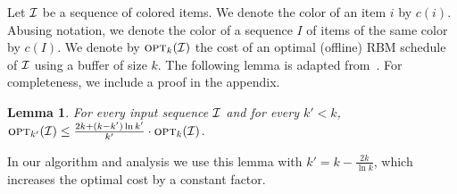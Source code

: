 \documentclass[12pt]{article}
\newtheorem{lemma}[theorem]{Lemma}
\newcommand{\opt}{{\hbox{\sc opt}}}
\begin{document}
Let ${\cal I}$ be a sequence of colored items. We denote
the color of an item $i$ by $c(i)$. Abusing notation, we
denote the color of a sequence $I$ of items of the same
color by $c(I)$. We denote
by $\opt_k({\cal I})$ the cost of an optimal (offline) RBM 
schedule of ${\cal I}$ using a buffer of size $k$. The
following lemma is adapted from~\cite{ERW09,ACER12}.
For completeness, we include a proof in the appendix.
\begin{lemma}\label{lm: resource augmentation}
For every input sequence ${\cal I}$ and for every $k'<k$,
$\opt_{k'}({\cal I})\le\frac{2k+(k-k')\ln k'}{k'}\cdot \opt_k({\cal I})$.
\end{lemma}
In our algorithm and analysis we use this lemma with
$k' = k - \frac{2k}{\ln k}$, which increases the optimal
cost by a constant factor.
\end{document}
